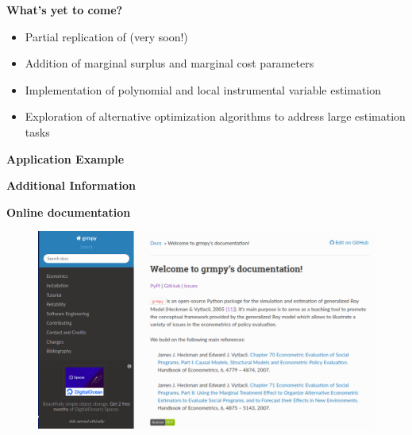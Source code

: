 \begin{frame}
	\textbf{What's yet to come?}
	\begin{itemize}
		\item Partial replication of  (very soon!)
		\item Addition of marginal surplus and marginal cost parameters
		\item Implementation of polynomial and local instrumental variable estimation
		\item Exploration of alternative optimization algorithms to address large estimation tasks
	\end{itemize}
\end{frame}

\begin{frame}\begin{center}
\LARGE\textbf{Application Example}
\end{center}\end{frame}


\begin{frame}\begin{center}
\LARGE\textbf{Additional Information}
\end{center}\end{frame}

\begin{frame}
\textbf{Online documentation}
\begin{figure}
  \includegraphics[scale=0.2]{../shared/04_grmpy_tutorial/docu.png}
\end{figure}

\end{frame}
